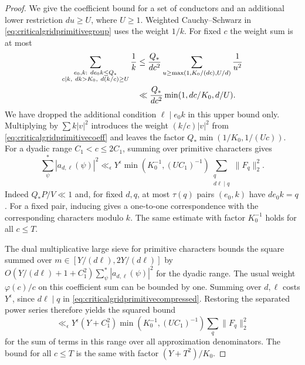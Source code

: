 \documentclass[11pt,a4paper]{article}
\numberwithin{equation}{section}
\begin{document}
\begin{proof}
We give the coefficient bound for a set of conductors
and an additional lower restriction $du\ge U$, where
$U\ge1$. Weighted Cauchy--Schwarz in
\cref{eq:criticalgridprimitivegroup} uses the weight $1/k$.
For fixed $c$ the weight sum is at most
\begin{align}
 \sum_{\substack{e_0,k:\ d e_0 k\le Q_*\\
                   c\mid k,\ dk>K_0,\ d(k/c)\ge U}}\frac1k
 &\le \frac{Q_*}{d c^2}
       \sum_{u\ge\max(1,K_0/(dc),U/d)}\frac1{u^2}\notag\\
 &\ll \frac{Q_*}{d c^2}
            \min(1,dc/K_0,d/U).
 \label{eq:criticalgridprimitiverepeats}
\end{align}
We have dropped the additional condition $\ell\mid e_0k$
in this upper bound only. Multiplying by $\sum k|v|^2$
introduces the weight $(k/c)|v|^2$ from
\cref{eq:criticalgridprimitivecoeff} and leaves the factor
$Q_*\min(1/K_0,1/(Uc))$. For a dyadic range $C_1<c\le2C_1$,
summing over primitive characters gives
\begin{equation}
 \sum_{\psi}^{*}|a_{d,\ell}(\psi)|^2
  \ll_\epsilon Y^\epsilon
           \min(K_0^{-1},(U C_1)^{-1})
                \sum_{\substack{q\\d\ell\mid q}}\|F_q\|_2^2 .
 \label{eq:criticalgridprimitivecompressed}
\end{equation}
Indeed $Q_*P/V\ll1$ and, for fixed $d,q$, at most
$\tau(q)$ pairs $(e_0,k)$ have $d e_0 k=q$. For a fixed
pair, inducing gives a one-to-one correspondence with
the corresponding characters modulo $k$. The same estimate
with factor $K_0^{-1}$ holds for all $c\le T$.

The dual multiplicative large sieve for primitive characters
\cite[Chapter~19]{MontgomeryVaughanMNTII} bounds the square summed
over $m\in[Y/(d\ell),2Y/(d\ell)]$ by
$O(Y/(d\ell)+1+C_1^2)\sum_\psi^*|a_{d,\ell}(\psi)|^2$
for the dyadic range. The usual weight $\varphi(c)/c$
on this coefficient sum can be bounded by one.
Summing over $d,\ell$ costs $Y^\epsilon$, since
$d\ell\mid q$ in \cref{eq:criticalgridprimitivecompressed}.
Restoring the separated power series therefore yields
the squared bound
\begin{equation}
 \ll_\epsilon Y^\epsilon(Y+C_1^2)
           \min(K_0^{-1},(U C_1)^{-1})\sum_q\|F_q\|_2^2
 \label{eq:criticalgridprimitivedual}
\end{equation}
for the sum of terms in this range over all approximation
denominators. The bound for all $c\le T$ is the same
with factor $(Y+T^2)/K_0$.


\end{proof}
\end{document}
